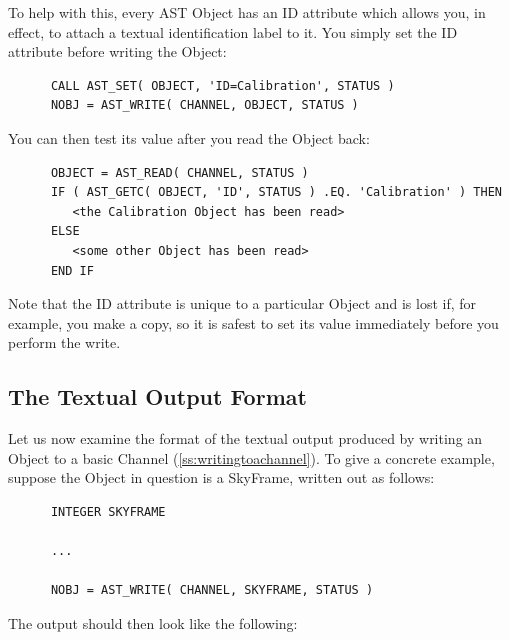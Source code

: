 \documentclass[twoside,11pt]{article}
\newcommand{\htmlref}[2]{#1}
\newcommand{\secref}[1]{\S\ref{#1}}
\renewcommand{\secref}[1]{\ref{#1}}
\begin{document}
To help with this, every AST \htmlref{Object}{Object} has an \htmlref{ID}{ID} attribute which allows
you, in effect, to attach a textual identification label to it. You
simply set the ID attribute before writing the Object:

\small
\begin{verbatim}
      CALL AST_SET( OBJECT, 'ID=Calibration', STATUS )
      NOBJ = AST_WRITE( CHANNEL, OBJECT, STATUS )
\end{verbatim}
\normalsize

You can then test its value after you read the Object back:

\small
\begin{verbatim}
      OBJECT = AST_READ( CHANNEL, STATUS )
      IF ( AST_GETC( OBJECT, 'ID', STATUS ) .EQ. 'Calibration' ) THEN
         <the Calibration Object has been read>
      ELSE
         <some other Object has been read>
      END IF
\end{verbatim}
\normalsize

Note that the ID attribute is unique to a particular Object and
is lost if, for example, you make a copy, so it is safest to set its
value immediately before you perform the write.

\subsection{\label{ss:textualoutputformat}The Textual Output Format} 

Let us now examine the format of the textual output produced by
writing an \htmlref{Object}{Object} to a basic \htmlref{Channel}{Channel}
(\secref{ss:writingtoachannel}). To give a concrete example, suppose
the Object in question is a \htmlref{SkyFrame}{SkyFrame}, written out as follows:

\small
\begin{verbatim}
      INTEGER SKYFRAME

      ...

      NOBJ = AST_WRITE( CHANNEL, SKYFRAME, STATUS )
\end{verbatim}
\normalsize

The output should then look like the following:
\end{document}
